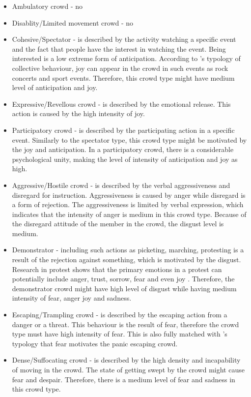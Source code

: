 \begin{itemize}
\item Ambulatory crowd - no
\item Disablity/Limited movement crowd - no
\item Cohesive/Spectator - is described by the activity watching a specific event and the fact that people have the interest in watching the event. Being interested is a low extreme form of anticipation. According to \citet{Lofland1985}'s typology of collective behaviour, joy can appear in the crowd in such events as rock concerts and sport events. Therefore, this crowd type might have medium level of anticipation and joy.
\item Expressive/Revellous crowd - is described by the emotional release. This action is caused by the high intensity of joy.
\item Participatory crowd - is described by the participating action in a specific event. Similarly to the spectator type, this crowd type might be motivated by the joy and anticipation. In a participatory crowd, there is a considerable psychological unity, making the level of intensity of anticipation and joy as high.
\item Aggressive/Hostile crowd - is described by the verbal aggressiveness and disregard for instruction. Aggressiveness is caused by anger while disregard is a form of rejection. The aggressiveness is limited by verbal expression, which indicates that the intensity of anger is medium in this crowd type. Because of the disregard attitude of the member in the crowd, the disgust level is medium.
\item Demonstrator - including such actions as picketing, marching, protesting is a result of the rejection against something, which is motivated by the disgust. Research in protest shows that the primary emotions in a protest can potentially include anger, trust, sorrow, fear and even joy \citep{jasper1998emotions}. Therefore, the demonstrator crowd might have high level of disgust while having medium intensity of fear, anger joy and sadness.
\item Escaping/Trampling crowd - is described by the escaping action from a danger or a threat. This behaviour is the result of fear, therefore the crowd type must have high intensity of fear. This is also fully matched with \citet{Lofland1985}'s typology that fear motivates the panic escaping crowd.
\item Dense/Suffocating crowd - is described by the high density and incapability of moving in the crowd. The state of getting swept by the crowd might cause fear and despair. Therefore, there is a medium level of fear and sadness in this crowd type.

\end{itemize}
